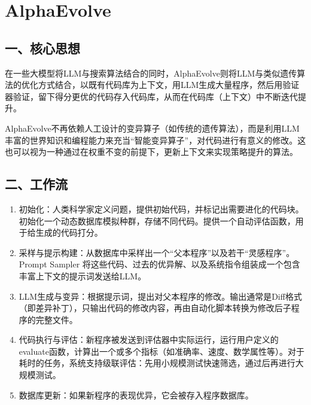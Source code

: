 \setcounter{section}{2}

\hypertarget{alphaevolve}{%
\section{AlphaEvolve}\label{alphaevolve}}

\hypertarget{ux4e00ux6838ux5fc3ux601dux60f3-10}{%
\subsection{一、核心思想}\label{ux4e00ux6838ux5fc3ux601dux60f3-10}}

在一些大模型将LLM与搜索算法结合的同时，AlphaEvolve则将LLM与类似遗传算法的优化方式结合，以既有代码库为上下文，用LLM生成大量程序，然后用验证器验证，留下得分更优的代码存入代码库，从而在代码库（上下文）中不断迭代提升。

AlphaEvolve不再依赖人工设计的变异算子（如传统的遗传算法），而是利用LLM丰富的世界知识和编程能力来充当``智能变异算子''，对代码进行有意义的修改。这也可以视为一种通过在权重不变的前提下，更新上下文来实现策略提升的算法。

\hypertarget{ux4e8cux5de5ux4f5cux6d41-1}{%
\subsection{二、工作流}\label{ux4e8cux5de5ux4f5cux6d41-1}}

\begin{enumerate}
\def\labelenumi{\arabic{enumi}.}
\item
  初始化：人类科学家定义问题，提供初始代码，并标记出需要进化的代码块。初始化一个动态数据库模拟种群，存储不同代码。提供一个自动评估函数，用于给生成的代码打分。
\item
  采样与提示构建：从数据库中采样出一个``父本程序''以及若干``灵感程序''。Prompt Sampler 将这些代码、过去的优异解、以及系统指令组装成一个包含丰富上下文的提示词发送给LLM。
\item
  LLM生成与变异：根据提示词，提出对父本程序的修改。输出通常是Diff格式（即差异补丁），只输出代码的修改内容，再由自动化脚本转换为修改后子程序的完整文件。
\item
  代码执行与评估：新程序被发送到评估器中实际运行，运行用户定义的evaluate函数，计算出一个或多个指标（如准确率、速度、数学属性等）。对于耗时的任务，系统支持级联评估：先用小规模测试快速筛选，通过后再进行大规模测试。
\item
  数据库更新：如果新程序的表现优异，它会被存入程序数据库。
\end{enumerate}

